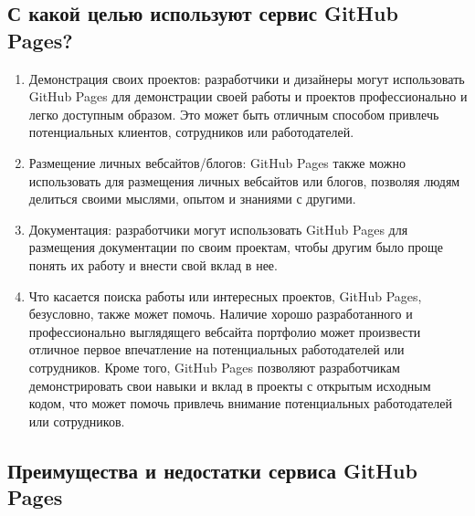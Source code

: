 \documentclass[letterpaper,10pt,russian]{sphinxmanual}
\begin{document}
\subsection{С какой целью используют сервис GitHub Pages?}
\label{\detokenize{educational_materials/github_pages/content:id1}}\begin{enumerate}
%
\item {} 
\sphinxAtStartPar
Демонстрация своих проектов: разработчики и дизайнеры могут использовать GitHub Pages для демонстрации своей работы и проектов профессионально и легко доступным образом. Это может быть отличным способом привлечь потенциальных клиентов, сотрудников или работодателей.

\item {} 
\sphinxAtStartPar
Размещение личных веб\sphinxhyphen{}сайтов/блогов: GitHub Pages также можно использовать для размещения личных веб\sphinxhyphen{}сайтов или блогов, позволяя людям делиться своими мыслями, опытом и знаниями с другими.

\item {} 
\sphinxAtStartPar
Документация: разработчики могут использовать GitHub Pages для размещения документации по своим проектам, чтобы другим было проще понять их работу и внести свой вклад в нее.

\item {} 
\sphinxAtStartPar
Что касается поиска работы или интересных проектов, GitHub Pages, безусловно, также может помочь. Наличие хорошо разработанного и профессионально выглядящего веб\sphinxhyphen{}сайта портфолио может произвести отличное первое впечатление на потенциальных работодателей или сотрудников. Кроме того, GitHub Pages позволяют разработчикам демонстрировать свои навыки и вклад в проекты с открытым исходным кодом, что может помочь привлечь внимание потенциальных работодателей или сотрудников.

\end{enumerate}


\subsection{Преимущества и недостатки сервиса GitHub Pages}
\label{\detokenize{educational_materials/github_pages/content:id2}}
\end{document}
